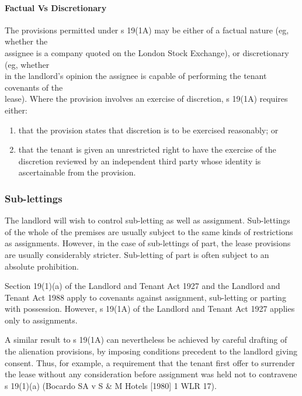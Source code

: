 \documentclass[
]{article}
\providecommand{\tightlist}{%
  \setlength{\itemsep}{0pt}\setlength{\parskip}{0pt}}
\begin{document}
\hypertarget{factual-vs-discretionary}{%
\paragraph{Factual Vs Discretionary}\label{factual-vs-discretionary}}

The provisions permitted under s 19(1A) may be either of a factual
nature (eg, whether the\\
assignee is a company quoted on the London Stock Exchange), or
discretionary (eg, whether\\
in the landlord's opinion the assignee is capable of performing the
tenant covenants of the\\
lease). Where the provision involves an exercise of discretion, s 19(1A)
requires either:

\begin{enumerate}
\tightlist
\item
  that the provision states that discretion is to be exercised
  reasonably; or
\item
  that the tenant is given an unrestricted right to have the exercise of
  the discretion reviewed by an independent third party whose identity
  is ascertainable from the provision.
\end{enumerate}

\hypertarget{sub-lettings}{%
\subsubsection{Sub-lettings}\label{sub-lettings}}

The landlord will wish to control sub-letting as well as assignment.
Sub-lettings of the whole of the premises are usually subject to the
same kinds of restrictions as assignments. However, in the case of
sub-lettings of part, the lease provisions are usually considerably
stricter. Sub-letting of part is often subject to an absolute
prohibition.

Section 19(1)(a) of the Landlord and Tenant Act 1927 and the Landlord
and Tenant Act 1988 apply to covenants against assignment, sub-letting
or parting with possession. However, s 19(1A) of the Landlord and Tenant
Act 1927 applies only to assignments.

A similar result to s 19(1A) can nevertheless be achieved by careful
drafting of the alienation provisions, by imposing conditions precedent
to the landlord giving consent. Thus, for example, a requirement that
the tenant first offer to surrender the lease without any consideration
before assignment was held not to contravene s 19(1)(a) (Bocardo SA v S
\& M Hotels {[}1980{]} 1 WLR 17).
\end{document}
